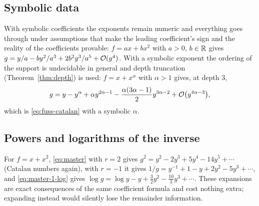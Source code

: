 \subsection{Symbolic data}

With symbolic coefficients the exponents remain numeric and everything goes through under assumptions that make the leading coefficient's sign and the reality of the coefficients provable: $f=ax+bx^2$ with $a>0$, $b\in\mathbb R$ gives $g=y/a-by^2/a^3+2b^2y^3/a^5+\mathcal O(y^4)$. With a symbolic exponent the ordering of the support is undecidable in general and depth truncation (Theorem~\ref{thm:depth}) is used: $f=x+x^\alpha$ with $\alpha>1$ gives, at depth $3$,
\[
 g=y-y^\alpha+\alpha y^{2\alpha-1}-\frac{\alpha(3\alpha-1)}{2}y^{3\alpha-2}+\mathcal O\bigl(y^{4\alpha-3}\bigr),
\]
which is \eqref{eq:fuss-catalan} with a symbolic $\alpha$.

\subsection{Powers and logarithms of the inverse}

For $f=x+x^2$, \eqref{eq:master} with $r=2$ gives $g^2=y^2-2y^3+5y^4-14y^5+\cdots$ (Catalan numbers again), with $r=-1$ it gives $1/g=y^{-1}+1-y+2y^2-5y^3+\cdots$, and \eqref{eq:master-1-log} gives $\log g=\log y-y+\tfrac32y^2-\tfrac{10}3y^3+\cdots$. These expansions are exact consequences of the same coefficient formula and cost nothing extra; expanding  instead would silently lose the remainder information.
